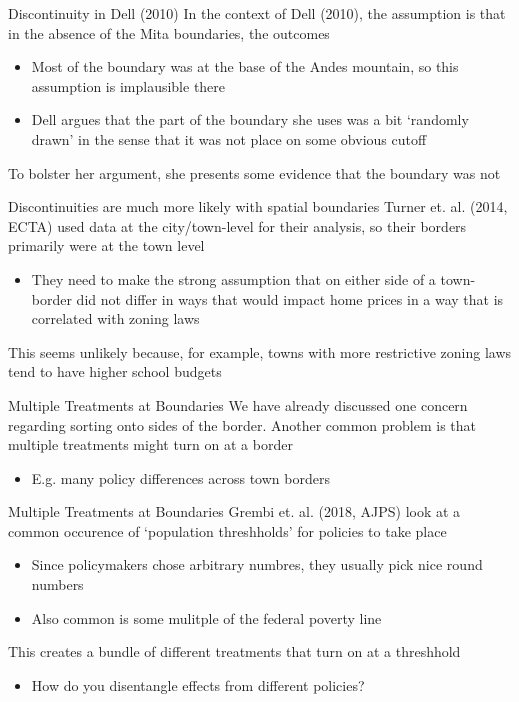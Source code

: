 \documentclass[aspectratio=169,t,11pt,table]{beamer}
\begin{document}
\begin{frame}{Discontinuity in Dell (2010)}
  In the context of Dell (2010), the assumption is that in the absence of the Mita boundaries, the outcomes
  \begin{itemize}
    \item Most of the boundary was at the base of the Andes mountain, so this assumption is implausible there
    \item Dell argues that the part of the boundary she uses was a bit `randomly drawn' in the sense that it was not place on some obvious cutoff
  \end{itemize}

  \bigskip
  To bolster her argument, she presents some evidence that the boundary was not 
\end{frame}

\begin{frame}{Discontinuities are much more likely with spatial boundaries}
  Turner et. al. (2014, ECTA) used data at the city/town-level for their analysis, so their borders primarily were at the town level
  \begin{itemize}
    \item They need to make the strong assumption that on either side of a town-border did not differ in ways that would impact home prices in a way that is correlated with zoning laws
  \end{itemize}

  \bigskip
  This seems unlikely because, for example, towns with more restrictive zoning laws tend to have higher school budgets
\end{frame}

\begin{frame}{Multiple Treatments at Boundaries}
  We have already discussed one concern regarding sorting onto sides of the border. Another common problem is that multiple treatments might turn on at a border
  \begin{itemize}
    \item E.g. many policy differences across town borders
  \end{itemize}
\end{frame}

\begin{frame}{Multiple Treatments at Boundaries}
  Grembi et. al. (2018, AJPS) look at a common occurence of `population threshholds' for policies to take place 
  \begin{itemize}
    \item Since policymakers chose arbitrary numbres, they usually pick nice round numbers
    \item Also common is some mulitple of the federal poverty line
  \end{itemize}

  \bigskip
  This creates a bundle of different treatments that turn on at a threshhold
  \begin{itemize}
    \item How do you disentangle effects from different policies?
  \end{itemize}
\end{frame}
\end{document}
